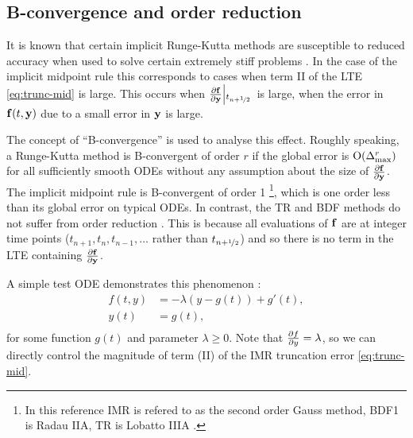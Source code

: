 \subsection{B-convergence and order reduction}
\label{sec:order-reduction}

It is known that certain implicit Runge-Kutta methods are susceptible to reduced accuracy when used to solve certain extremely stiff problems \cite[156]{Atkinson1994} \cite[225]{HairerWanner}.
In the case of the implicit midpoint rule this corresponds to cases when term II of the LTE \cref{eq:trunc-mid} is large. 
This occurs when $\frac{\partial {\mathbf{f}}}{\partial \mathbf{y}}{\left|_{t_{n+\nicefrac{1}{2}}{}}\right.}$ is large, \ie when the error in ${\mathbf{f}{\left( t, \mathbf{y} \right)}}$ due to a small error in $\mathbf{y}$ is large.

The concept of ``B-convergence'' is used to analyse this effect.
Roughly speaking, a Runge-Kutta method is B-convergent of order $r$ if the global error is  $\text{O}{\left( \Delta_{\text{max}}^r \right)}$ for all sufficiently smooth ODEs without any assumption about the size of $\frac{\partial {\mathbf{f}}}{\partial \mathbf{y}}$.
The implicit midpoint rule is B-convergent of order 1 \cite[231]{HairerWanner}\footnote{In this reference IMR is refered to as the second order Gauss method, BDF1 is Radau IIA, TR is Lobatto IIIA \cite[72-76]{HairerWanner}.}, which is one order less than its global error on typical ODEs.
In contrast, the TR and BDF methods do not suffer from order reduction \cite[159]{Atkinson1994}.
This is because all evaluations of ${\mathbf{f}}$ are at integer time points (\ie $t_{n+1}, t_{n}, t_{n-1}, \ldots$ rather than $t_{n+\nicefrac{1}{2}}$) and so there is no term in the LTE containing $\frac{\partial {\mathbf{f}}}{\partial \mathbf{y}}$.

A simple test ODE demonstrates this phenomenon \cite[157]{Atkinson2009}:
\begin{equation}
  \begin{aligned}
    \label{eqn:imr-test-order-reduction}
    f(t, y) &= -\lambda (y - g(t)) + g'(t), \\
    y(t) &= g(t), \\
  \end{aligned}
\end{equation}
for some function $g(t)$ and parameter $\lambda \geq 0$.
Note that $\frac{\partial f}{\partial y} = \lambda$, so we can directly control the magnitude of term (II) of the IMR truncation error \eqref{eq:trunc-mid}.

